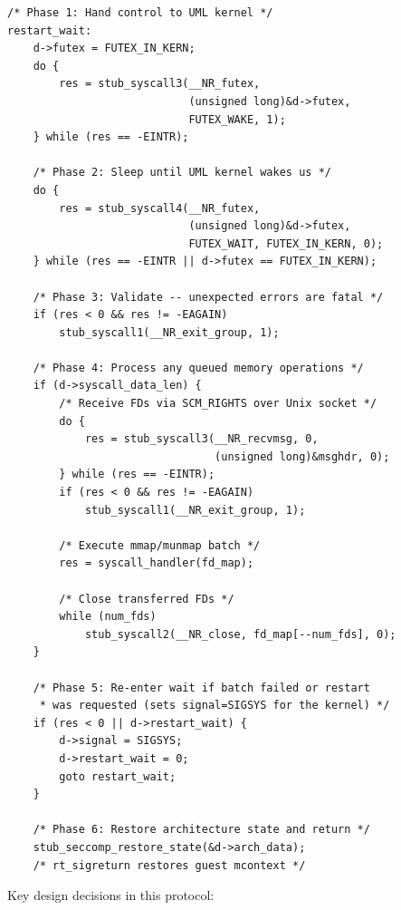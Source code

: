 \begin{lstlisting}[language=KernelC,caption={Futex protocol in \texttt{stub\_signal\_interrupt()} (from \texttt{arch/um/kernel/skas/stub.c})},label=lst:futex-protocol-full]
/* Phase 1: Hand control to UML kernel */
restart_wait:
    d->futex = FUTEX_IN_KERN;
    do {
        res = stub_syscall3(__NR_futex,
                            (unsigned long)&d->futex,
                            FUTEX_WAKE, 1);
    } while (res == -EINTR);

    /* Phase 2: Sleep until UML kernel wakes us */
    do {
        res = stub_syscall4(__NR_futex,
                            (unsigned long)&d->futex,
                            FUTEX_WAIT, FUTEX_IN_KERN, 0);
    } while (res == -EINTR || d->futex == FUTEX_IN_KERN);

    /* Phase 3: Validate -- unexpected errors are fatal */
    if (res < 0 && res != -EAGAIN)
        stub_syscall1(__NR_exit_group, 1);

    /* Phase 4: Process any queued memory operations */
    if (d->syscall_data_len) {
        /* Receive FDs via SCM_RIGHTS over Unix socket */
        do {
            res = stub_syscall3(__NR_recvmsg, 0,
                                (unsigned long)&msghdr, 0);
        } while (res == -EINTR);
        if (res < 0 && res != -EAGAIN)
            stub_syscall1(__NR_exit_group, 1);

        /* Execute mmap/munmap batch */
        res = syscall_handler(fd_map);

        /* Close transferred FDs */
        while (num_fds)
            stub_syscall2(__NR_close, fd_map[--num_fds], 0);
    }

    /* Phase 5: Re-enter wait if batch failed or restart
     * was requested (sets signal=SIGSYS for the kernel) */
    if (res < 0 || d->restart_wait) {
        d->signal = SIGSYS;
        d->restart_wait = 0;
        goto restart_wait;
    }

    /* Phase 6: Restore architecture state and return */
    stub_seccomp_restore_state(&d->arch_data);
    /* rt_sigreturn restores guest mcontext */
\end{lstlisting}

Key design decisions in this protocol:

